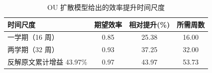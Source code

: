 \begin{table}[htbp]
\centering
\small
\caption{OU 扩散模型给出的效率提升时间尺度}
\label{tab:gain}
\begin{tabular}{lccc}
\toprule
时间尺度 & 期望效率 & 相对提升(\%) & 所需周数 \\
\midrule
一学期（16 周） & 0.85 & 25.38 & 16.00 \\
两学期（32 周） & 0.93 & 37.25 & 32.00 \\
反解原文累计增益 43.97\% & 0.97 & 43.97 & 53.73 \\
\bottomrule
\end{tabular}
\end{table}
